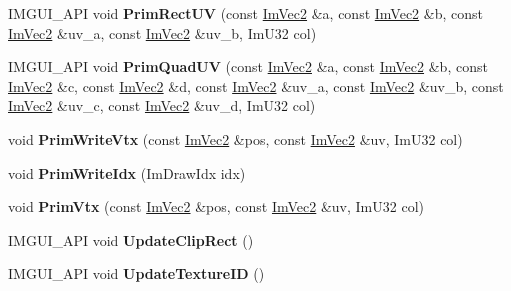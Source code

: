 \begin{DoxyCompactItemize}
\item 
\mbox{\label{struct_im_draw_list_a77d48ed5b33ccdd908824c0a3bebfff8}} 
I\+M\+G\+U\+I\+\_\+\+A\+PI void {\bfseries Prim\+Rect\+UV} (const \hyperlink{struct_im_vec2}{Im\+Vec2} \&a, const \hyperlink{struct_im_vec2}{Im\+Vec2} \&b, const \hyperlink{struct_im_vec2}{Im\+Vec2} \&uv\+\_\+a, const \hyperlink{struct_im_vec2}{Im\+Vec2} \&uv\+\_\+b, Im\+U32 col)
\item 
\mbox{\label{struct_im_draw_list_a9df27414aaca5f34ac3664a8b82582b5}} 
I\+M\+G\+U\+I\+\_\+\+A\+PI void {\bfseries Prim\+Quad\+UV} (const \hyperlink{struct_im_vec2}{Im\+Vec2} \&a, const \hyperlink{struct_im_vec2}{Im\+Vec2} \&b, const \hyperlink{struct_im_vec2}{Im\+Vec2} \&c, const \hyperlink{struct_im_vec2}{Im\+Vec2} \&d, const \hyperlink{struct_im_vec2}{Im\+Vec2} \&uv\+\_\+a, const \hyperlink{struct_im_vec2}{Im\+Vec2} \&uv\+\_\+b, const \hyperlink{struct_im_vec2}{Im\+Vec2} \&uv\+\_\+c, const \hyperlink{struct_im_vec2}{Im\+Vec2} \&uv\+\_\+d, Im\+U32 col)
\item 
\mbox{\label{struct_im_draw_list_af86de4faf6c8e978fb712ea14c5d0c5f}} 
void {\bfseries Prim\+Write\+Vtx} (const \hyperlink{struct_im_vec2}{Im\+Vec2} \&pos, const \hyperlink{struct_im_vec2}{Im\+Vec2} \&uv, Im\+U32 col)
\item 
\mbox{\label{struct_im_draw_list_a42b72f87a0084c02f11dcd1560c8bbc7}} 
void {\bfseries Prim\+Write\+Idx} (Im\+Draw\+Idx idx)
\item 
\mbox{\label{struct_im_draw_list_a405377158f0028ad8b4fb6509eef4532}} 
void {\bfseries Prim\+Vtx} (const \hyperlink{struct_im_vec2}{Im\+Vec2} \&pos, const \hyperlink{struct_im_vec2}{Im\+Vec2} \&uv, Im\+U32 col)
\item 
\mbox{\label{struct_im_draw_list_a5978db1fc49be781978699e85c6a3251}} 
I\+M\+G\+U\+I\+\_\+\+A\+PI void {\bfseries Update\+Clip\+Rect} ()
\item 
\mbox{\label{struct_im_draw_list_a58998853ed37538ae5a638da032b0005}} 
I\+M\+G\+U\+I\+\_\+\+A\+PI void {\bfseries Update\+Texture\+ID} ()
\end{DoxyCompactItemize}
